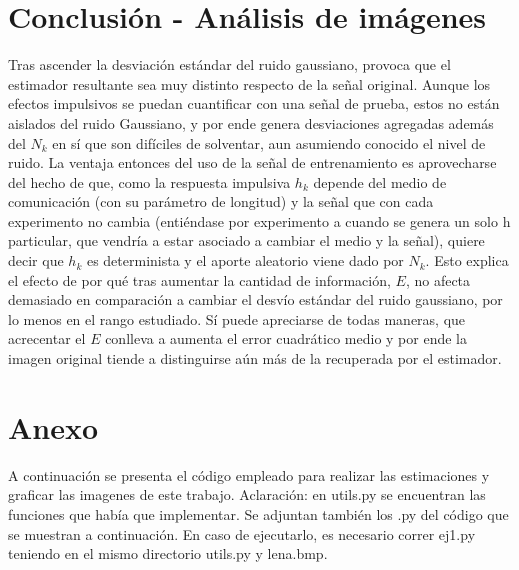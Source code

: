 
\section{Conclusi\'on - An\'alisis de im\'agenes}
Tras ascender la desviaci\'on est\'andar del ruido gaussiano, provoca que el estimador resultante sea muy distinto respecto de la se\~nal original. Aunque los efectos impulsivos se puedan cuantificar con una se\~nal de prueba, estos no est\'an aislados del ruido Gaussiano, y por ende genera desviaciones agregadas adem\'as del $N_k$ en s\'i que son dif\'iciles de solventar, aun asumiendo conocido el nivel de ruido. La ventaja entonces del uso de la se\~nal de entrenamiento es aprovecharse del hecho de que, como la respuesta impulsiva $h_k$ depende del medio de comunicaci\'on (con su par\'ametro de longitud) y la se\~nal que con cada experimento no cambia (enti\'endase por experimento a cuando se genera un solo h particular, que vendr\'ia a estar asociado a cambiar el medio y la se\~nal), quiere decir que $h_k$ es determinista y el aporte aleatorio viene dado por $N_k$. Esto explica el efecto de por qu\'e tras aumentar la cantidad de informaci\'on, $E$, no afecta demasiado en comparaci\'on a cambiar el desv\'io est\'andar del ruido gaussiano, por lo menos en el rango estudiado. Sí puede apreciarse de todas maneras, que acrecentar el $E$ conlleva a aumenta el error cuadr\'atico medio y por ende la imagen original tiende a distinguirse a\'un m\'as de la recuperada por el estimador. 

\section{Anexo}
A continuaci\'on se presenta el c\'odigo empleado para realizar las estimaciones y graficar las imagenes de este trabajo. 
Aclaraci\'on: en utils.py se encuentran las funciones que hab\'ia que implementar. Se adjuntan tambi\'en los .py del c\'odigo que se muestran a continuaci\'on. En caso de ejecutarlo, es necesario correr ej1.py teniendo en el mismo directorio utils.py y lena.bmp.


